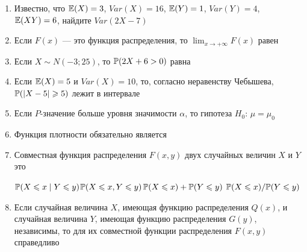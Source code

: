 \documentclass[pdftex,12pt,a4paper]{article}
\begin{document}
\begin{enumerate}


\item Известно, что $\E(X)=3$, $Var(X)=16$, $\E(Y)=1$, $Var(Y)=4$, $\E(XY)=6$, найдите $Var(2X-7)$


\item Если $F(x)$ --- это функция распределения, то $\lim_{x\to +\infty}F(x)$ равен


\item Если $X\sim N(-3;25)$, то $\P(2X+6>0)$ равна


\item Если $\E(X)=5$ и $Var(X)=10$, то, согласно неравенству Чебышева, $\P(|X-5|\geq 5)$ лежит в интервале

\otvet{$[0;1]$}{$[0;0.4]$}{$[0.4;1]$}{$[0;0.6]$}{$[0.6;1]$}


\item Если $P$-значение больше уровня значимости $\alpha$, то гипотеза $H_0$: $\mu=\mu_0$


\item Функция плотности обязательно является 


\item Совместная функция распределения $F(x,y)$ двух случайных величин $X$ и $Y$ это

{$\P(X\leq x\mid Y\leq y)$}{$\P(X\leq x,Y\leq y)$}{$\P(X\leq x)+\P(Y\leq y)$}
{$\P(X\leq x)/ \P(Y\leq y)$}


\item Если случайная величина $X$, имеющая функцию распределения $Q(x)$, и случайная величина $Y$, имеющая функцию распределения $G(y)$, независимы, то для их совместной функции распределения  $F(x,y)$ справедливо


\end{enumerate}
\end{document}

